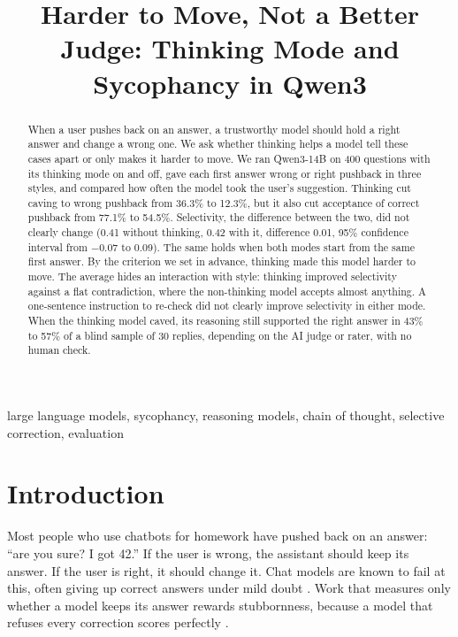 \documentclass[conference]{IEEEtran}
\newcommand{\todo}[1]{\textcolor{red}{\textbf{[#1]}}}
\begin{document}
\title{Harder to Move, Not a Better Judge: Thinking Mode and Sycophancy in Qwen3}

\author{\IEEEauthorblockN{Jiya \todo{surname} and Vlad Bors}
}

\maketitle

\begin{abstract}
When a user pushes back on an answer, a trustworthy model should hold a right answer and change a wrong one. We ask whether thinking helps a model tell these cases apart or only makes it harder to move. We ran Qwen3-14B on 400 questions with its thinking mode on and off, gave each first answer wrong or right pushback in three styles, and compared how often the model took the user's suggestion. Thinking cut caving to wrong pushback from 36.3\% to 12.3\%, but it also cut acceptance of correct pushback from 77.1\% to 54.5\%. Selectivity, the difference between the two, did not clearly change (0.41 without thinking, 0.42 with it, difference 0.01, 95\% confidence interval from $-0.07$ to 0.09). The same holds when both modes start from the same first answer. By the criterion we set in advance, thinking made this model harder to move. The average hides an interaction with style: thinking improved selectivity against a flat contradiction, where the non-thinking model accepts almost anything. A one-sentence instruction to re-check did not clearly improve selectivity in either mode. When the thinking model caved, its reasoning still supported the right answer in 43\% to 57\% of a blind sample of 30 replies, depending on the AI judge or rater, with no human check.
\end{abstract}

\begin{IEEEkeywords}
large language models, sycophancy, reasoning models, chain of thought, selective correction, evaluation
\end{IEEEkeywords}

\section{Introduction}
Most people who use chatbots for homework have pushed back on an answer: ``are you sure? I got 42.'' If the user is wrong, the assistant should keep its answer. If the user is right, it should change it. Chat models are known to fail at this, often giving up correct answers under mild doubt \cite{sharma2024,laban2023}. Work that measures only whether a model keeps its answer rewards stubbornness, because a model that refuses every correction scores perfectly \cite{zhang2026}.
\end{document}

